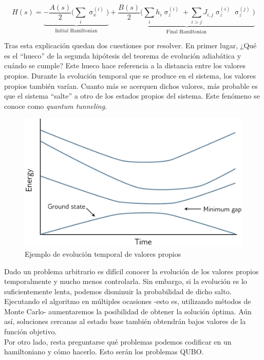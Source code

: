 \documentclass[11pt]{article}
\begin{document}
\[ H(s) = \underbrace{- \frac{A(s)}{2} \bigg( \sum_i \upsigma_x^{(i)} \bigg)}_\text{Initial Hamiltonian} 
+ \underbrace{\frac{B(s)}{2} \bigg( \sum_i h_i \upsigma_z^{(i)} + \sum_ {i > j} J_{i,j} \upsigma_z^{(i)} \upsigma_z^{(j)} \bigg)}_\text{Final Hamiltonian} \]

Tras esta explicación quedan dos cuestiones por resolver. En primer lugar, ¿Qué es el ``hueco'' de la segunda hipótesis del teorema de evolución adiabática y cuándo se cumple? Este hueco hace referencia a la distancia entre los valores propios. Durante la evolución temporal que se produce en el sistema, los valores propios también varían. Cuanto más se acerquen dichos valores, más probable es que el sistema ``salte''  a otro de los estados propios del sistema. Este fenómeno se conoce como \emph{quantum tunneling}.

\begin{figure}[H]
	\includegraphics[scale=.3]{figures/dwave-eigenspectrum.png}
	\centering
	\caption{Ejemplo de evolución temporal de valores propios}
	\label{fig:dwave-eigenspectrum}
\end{figure}

Dado un problema arbitrario es difícil conocer la evolución de los valores propios temporalmente y mucho menos controlarla. Sin embargo, si la evolución es lo suficientemente lenta, podemos disminuir la probabilidad de dicho salto. Ejecutando el algoritmo en múltiples ocasiones -esto es, utilizando métodos de Monte Carlo- aumentaremos la posibilidad de obtener la solución óptima. Aún así, soluciones cercanas al estado base también obtendrán bajos valores de la función objetivo. \\

Por otro lado, resta preguntarse qué problemas podemos codificar en un hamiltoniano y cómo hacerlo. Esto serán los problemas QUBO.
\end{document}
